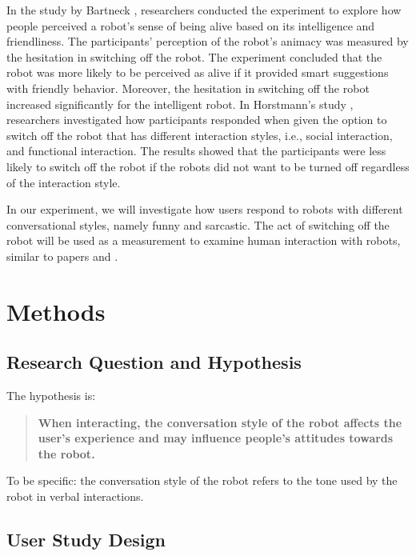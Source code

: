 \documentclass[conference]{IEEEtran}
\begin{document}
In the study by Bartneck \cite{bartneck_daisy_2007}, researchers conducted the experiment to explore how people perceived a robot's sense of being alive based on its intelligence and friendliness. The participants' perception of the robot's animacy was measured by the hesitation in switching off the robot. The experiment concluded  that the robot was more likely to be perceived as alive if it provided smart suggestions with friendly behavior. Moreover, the hesitation in switching off the robot increased significantly for the intelligent robot. In Horstmann's study \cite{horstmann_robots_2018}, researchers investigated how participants responded when given the option to switch off the robot that has different interaction styles, i.e., social interaction, and functional interaction. The results showed that the participants were less likely to switch off the robot if the robots did not want to be turned off regardless of the interaction style.

In our experiment, we will investigate how users respond to robots with different conversational styles, namely funny and sarcastic. The act of switching off the robot will be used as a measurement to examine human interaction with robots, similar to papers \cite{horstmann_robots_2018} and \cite{bartneck_daisy_2007}.

\section{Methods}
\label{sec:Methods}

\subsection{Research Question and Hypothesis}


The hypothesis is:

\begin{quote}
    \textbf{When interacting, the conversation style of the robot affects the user's experience and may influence people's attitudes towards the robot.}
\end{quote}

To be specific: the conversation style of the robot refers to the tone used by the robot in verbal interactions.



\subsection{User Study Design}
\end{document}
